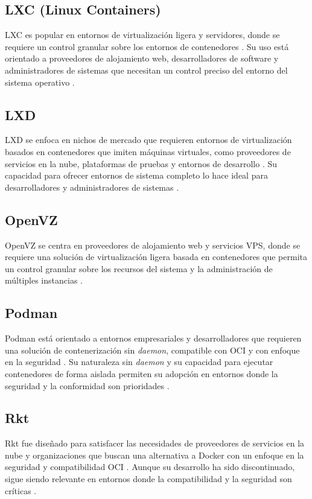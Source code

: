 \subsection{LXC (Linux Containers)}
\noindent
LXC es popular en entornos de virtualización ligera y servidores, donde se requiere un control granular sobre los entornos de contenedores \citep{Silva2024}. Su uso está orientado a proveedores de alojamiento web, desarrolladores de software y administradores de sistemas que necesitan un control preciso del entorno del sistema operativo \citep{Simon2023}.

\subsection{LXD}
\noindent
LXD se enfoca en nichos de mercado que requieren entornos de virtualización basados en contenedores que imiten máquinas virtuales, como proveedores de servicios en la nube, plataformas de pruebas y entornos de desarrollo \citep{Silva2024}. Su capacidad para ofrecer entornos de sistema completo lo hace ideal para desarrolladores y administradores de sistemas \citep{Kaiser2022}.

\subsection{OpenVZ}
\noindent
OpenVZ se centra en proveedores de alojamiento web y servicios VPS, donde se requiere una solución de virtualización ligera basada en contenedores que permita un control granular sobre los recursos del sistema y la administración de múltiples instancias \citep{OpenVZ2015}.

\subsection{Podman}
\noindent
Podman está orientado a entornos empresariales y desarrolladores que requieren una solución de contenerización sin \textit{daemon}, compatible con OCI y con enfoque en la seguridad \citep{Surendhar2024}. Su naturaleza sin \textit{daemon} y su capacidad para ejecutar contenedores de forma aislada permiten su adopción en entornos donde la seguridad y la conformidad son prioridades \citep{Trevor2022}.

\subsection{Rkt}
\noindent
Rkt fue diseñado para satisfacer las necesidades de proveedores de servicios en la nube y organizaciones que buscan una alternativa a Docker con un enfoque en la seguridad y compatibilidad OCI \citep{Lingayat2018}. Aunque su desarrollo ha sido discontinuado, sigue siendo relevante en entornos donde la compatibilidad y la seguridad son críticas \citep{Watada2019}.

